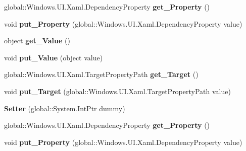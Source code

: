 \begin{DoxyCompactItemize}
global\+::\+Windows.\+U\+I.\+Xaml.\+Dependency\+Property {\bfseries get\+\_\+\+Property} ()
\item 
\mbox{\label{class_windows_1_1_u_i_1_1_xaml_1_1_setter_ab6f14c994bdff627cc05c2de84c4e918}} 
void {\bfseries put\+\_\+\+Property} (global\+::\+Windows.\+U\+I.\+Xaml.\+Dependency\+Property value)
\item 
\mbox{\label{class_windows_1_1_u_i_1_1_xaml_1_1_setter_a36e13b544319d51446f95fa1d4f99345}} 
object {\bfseries get\+\_\+\+Value} ()
\item 
\mbox{\label{class_windows_1_1_u_i_1_1_xaml_1_1_setter_aa1b1137b1463b4c0fcf2698f1ef38332}} 
void {\bfseries put\+\_\+\+Value} (object value)
\item 
\mbox{\label{class_windows_1_1_u_i_1_1_xaml_1_1_setter_a354e09225c55d9bc08796200969e6dbc}} 
global\+::\+Windows.\+U\+I.\+Xaml.\+Target\+Property\+Path {\bfseries get\+\_\+\+Target} ()
\item 
\mbox{\label{class_windows_1_1_u_i_1_1_xaml_1_1_setter_a625ef62aa1e630e8cfe82e287e278cb2}} 
void {\bfseries put\+\_\+\+Target} (global\+::\+Windows.\+U\+I.\+Xaml.\+Target\+Property\+Path value)
\item 
\mbox{\label{class_windows_1_1_u_i_1_1_xaml_1_1_setter_a8afe01be4ca04014f678f20627344902}} 
{\bfseries Setter} (global\+::\+System.\+Int\+Ptr dummy)
\item 
\mbox{\label{class_windows_1_1_u_i_1_1_xaml_1_1_setter_a686887dcaf21b9a12cd491564e78b429}} 
global\+::\+Windows.\+U\+I.\+Xaml.\+Dependency\+Property {\bfseries get\+\_\+\+Property} ()
\item 
\mbox{\label{class_windows_1_1_u_i_1_1_xaml_1_1_setter_ab6f14c994bdff627cc05c2de84c4e918}} 
void {\bfseries put\+\_\+\+Property} (global\+::\+Windows.\+U\+I.\+Xaml.\+Dependency\+Property value)
\item 
\mbox{\label{class_windows_1_1_u_i_1_1_xaml_1_1_setter_a36e13b544319d51446f95fa1d4f99345}} 

\end{DoxyCompactItemize}
